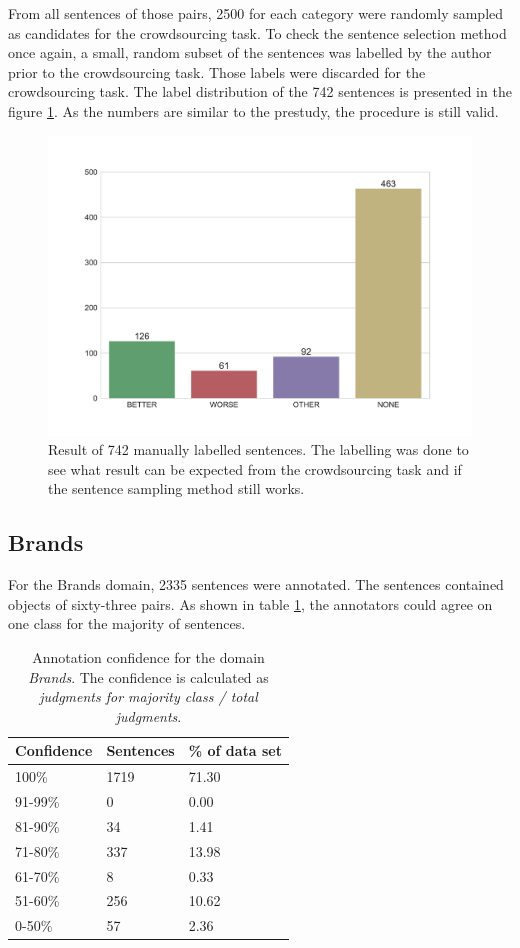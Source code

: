From all sentences of those pairs, 2500 for each category were randomly sampled as candidates for the crowdsourcing task. To check the sentence selection method once again, a small, random subset of the sentences was labelled by the author prior to the crowdsourcing task. Those labels were discarded for the crowdsourcing task.
The label distribution of the 742 sentences is presented in the figure \ref{fig:sample}. As the numbers are similar to the prestudy, the procedure is still valid.


\begin{figure}[h]
\centering
\caption{Result of 742 manually labelled sentences. The labelling was done to see what result can be expected from the crowdsourcing task and if the sentence sampling method still works.}
\label{fig:sample}
\includegraphics[width=0.8\linewidth]{images/dataset/pre-dist}
\end{figure}
\FloatBarrier
\subsection{Brands}
\label{sec:brands}

For the Brands domain, 2335 sentences were annotated. The sentences contained objects of sixty-three pairs. As shown in table \ref{fig:brand_agg}, the annotators could agree on one class for the majority of sentences.


\begin{table}[h]
\caption{Annotation confidence for the domain \emph{Brands}. The confidence is calculated as \emph{judgments for majority class / total judgments}.}
\label{fig:brand_agg}
\begin{tabularx}{\textwidth}{XXX}
\toprule
Confidence & Sentences & \% of data set \\
\midrule
100\%	&	1719	&	71.30	 \\ 
91-99\%	&	0	&	0.00	 \\ 
81-90\%	&	34	&	1.41	 \\ 
71-80\%	&	337	&	13.98	 \\ 
61-70\%	&	8	&	0.33	 \\ 
51-60\%	&	256	&	10.62	 \\ 
0-50\%	&	57	&	2.36	 \\ 
\bottomrule
\end{tabularx}
\end{table}



